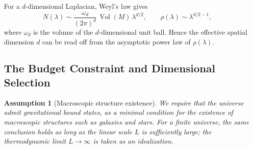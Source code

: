 \documentclass{article}
\newtheorem{assumption}[theorem]{Assumption}
\begin{document}
For a $d$-dimensional Laplacian, Weyl’s law gives
\[
N(\lambda) \sim \frac{\omega_d}{(2\pi)^d}\,\operatorname{Vol}(M)\,\lambda^{d/2},\qquad \rho(\lambda) \sim \lambda^{d/2-1},
\]
where $\omega_d$ is the volume of the $d$-dimensional unit ball. Hence the effective spatial dimension $d$ can be read off from the asymptotic power law of $\rho(\lambda)$.

\subsection{The Budget Constraint and Dimensional Selection}
\begin{assumption}[Macroscopic structure existence]
We require that the universe admit gravitational bound states, as a minimal condition for the existence of macroscopic structures such as galaxies and stars. For a finite universe, the same conclusion holds as long as the linear scale $L$ is sufficiently large; the thermodynamic limit $L\to\infty$ is taken as an idealization.
\end{assumption}
\end{document}
